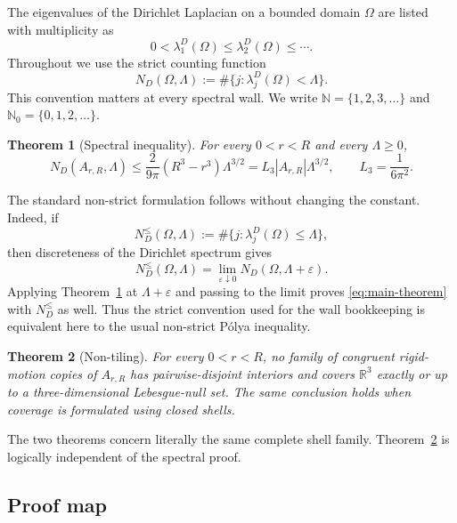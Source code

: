 \documentclass[11pt]{article}
\numberwithin{equation}{section}
\newtheorem{theorem}{Theorem}[section]
\theoremstyle{definition}
\theoremstyle{remark}
\newcommand{\R}{\mathbb R}
\newcommand{\N}{\mathbb N}
\newcommand{\Nzero}{\mathbb N_0}
\begin{document}
The eigenvalues of the Dirichlet Laplacian on a bounded domain \(\Omega\) are
listed with multiplicity as
\[
  0<\lambda_1^D(\Omega)\le\lambda_2^D(\Omega)\le\cdots.
\]
Throughout we use the strict counting function
\begin{equation}
  N_D(\Omega,\Lambda)
  :=\#\{j:\lambda_j^D(\Omega)<\Lambda\}.
  \label{eq:strict-count}
\end{equation}
This convention matters at every spectral wall.  We write
\(\N=\{1,2,3,\ldots\}\) and \(\Nzero=\{0,1,2,\ldots\}\).

\begin{theorem}[Spectral inequality]
\label{thm:spectral}
For every \(0<r<R\) and every \(\Lambda\ge0\),
\begin{equation}
  \boxed{
  N_D(A_{r,R},\Lambda)
  \le \frac{2}{9\pi}(R^3-r^3)\Lambda^{3/2}
  =L_3|A_{r,R}|\Lambda^{3/2},
  \qquad L_3=\frac1{6\pi^2}.}
  \label{eq:main-theorem}
\end{equation}
\end{theorem}

The standard non-strict formulation follows without changing the constant.
Indeed, if
\[
 N_D^{\leq}(\Omega,\Lambda)
 :=\#\{j:\lambda_j^D(\Omega)\leq\Lambda\},
\]
then discreteness of the Dirichlet spectrum gives
\begin{equation}
 N_D^{\leq}(\Omega,\Lambda)
 =\lim_{\varepsilon\downarrow0}
 N_D(\Omega,\Lambda+\varepsilon).
 \label{eq:strict-to-nonstrict}
\end{equation}
Applying Theorem~\ref{thm:spectral} at
\(\Lambda+\varepsilon\) and passing to the limit proves
\eqref{eq:main-theorem} with \(N_D^{\leq}\) as well.  Thus the strict
convention used for the wall bookkeeping is equivalent here to the usual
non-strict P\'olya inequality.

\begin{theorem}[Non-tiling]
\label{thm:nontiling}
For every \(0<r<R\), no family of congruent rigid-motion copies of
\(A_{r,R}\) has pairwise-disjoint interiors and covers \(\R^3\) exactly or
up to a three-dimensional Lebesgue-null set.  The same conclusion holds when
coverage is formulated using closed shells.
\end{theorem}

The two theorems concern literally the same complete shell family.
Theorem~\ref{thm:nontiling} is logically independent of the spectral proof.

\subsection*{Proof map}
\end{document}
